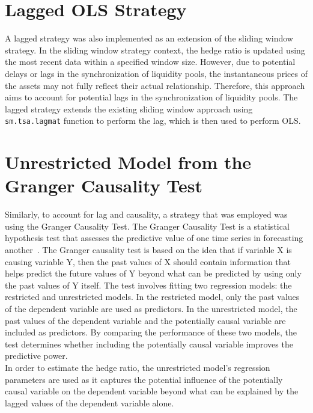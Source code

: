 \section{Lagged OLS Strategy}
A lagged strategy was also implemented as an extension of the sliding window strategy. In the sliding window strategy context, the hedge ratio is updated using the most recent data within a specified window size. However, due to potential delays or lags in the synchronization of liquidity pools, the instantaneous prices of the assets may not fully reflect their actual relationship. Therefore, this approach aims to account for potential lags in the synchronization of liquidity pools. The lagged strategy extends the existing sliding window approach using \texttt{sm.tsa.lagmat} function to perform the lag, which is then used to perform OLS.

\section{Unrestricted Model from the Granger Causality Test}
Similarly, to account for lag and causality, a strategy that was employed was using the Granger Causality Test. The Granger Causality Test is a statistical hypothesis test that assesses the predictive value of one time series in forecasting another~\cite{noauthor_granger_nodate}. The Granger causality test is based on the idea that if variable X is causing variable Y, then the past values of X should contain information that helps predict the future values of Y beyond what can be predicted by using only the past values of Y itself. The test involves fitting two regression models: the restricted and unrestricted models. In the restricted model, only the past values of the dependent variable are used as predictors. In the unrestricted model, the past values of the dependent variable and the potentially causal variable are included as predictors. By comparing the performance of these two models, the test determines whether including the potentially causal variable improves the predictive power.
\\[3mm]
In order to estimate the hedge ratio, the unrestricted model's regression parameters are used as it captures the potential influence of the potentially causal variable on the dependent variable beyond what can be explained by the lagged values of the dependent variable alone.

